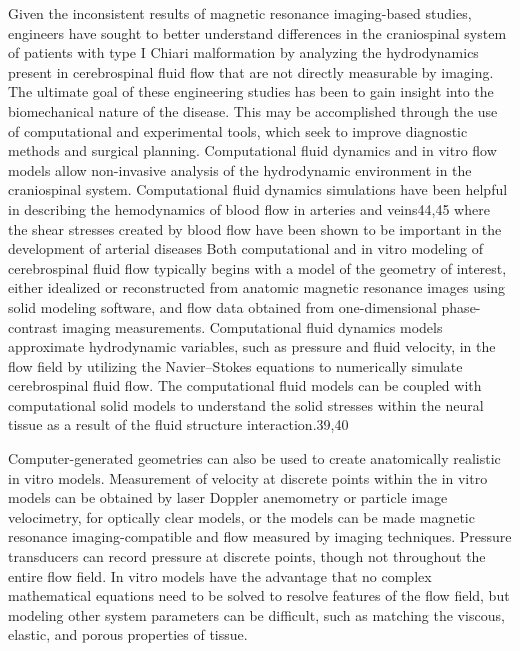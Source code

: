 \documentclass{report}
\begin{document}
Given the inconsistent results of magnetic resonance
imaging-based studies, engineers have sought to
better understand differences in the craniospinal
system of patients with type I Chiari malformation
by analyzing the hydrodynamics present in cerebrospinal
fluid flow that are not directly measurable
by imaging. The ultimate goal of these engineering
studies has been to gain insight into the biomechanical
nature of the disease. This may be accomplished
through the use of computational and experimental
tools, which seek to improve diagnostic methods and
surgical planning.
Computational fluid dynamics and in vitro flow
models allow non-invasive analysis of the hydrodynamic
environment in the craniospinal system.
Computational fluid dynamics simulations have been
helpful in describing the hemodynamics of blood flow
in arteries and veins44,45 where the shear stresses
created by blood flow have been shown to be
important in the development of arterial diseases
Both computational and in vitro modeling of
cerebrospinal fluid flow typically begins with a model
of the geometry of interest, either idealized or
reconstructed from anatomic magnetic resonance
images using solid modeling software, and flow data
obtained from one-dimensional phase-contrast imaging
measurements. Computational fluid dynamics
models approximate hydrodynamic variables, such as
pressure and fluid velocity, in the flow field by
utilizing the Navier–Stokes equations to numerically
simulate cerebrospinal fluid flow. The computational
fluid models can be coupled with computational solid
models to understand the solid stresses within the
neural tissue as a result of the fluid structure
interaction.39,40

Computer-generated geometries can also be used
to create anatomically realistic in vitro models.
Measurement of velocity at discrete points within
the in vitro models can be obtained by laser Doppler
anemometry or particle image velocimetry, for
optically clear models, or the models can be made
magnetic resonance imaging-compatible and flow
measured by imaging techniques. Pressure transducers
can record pressure at discrete points, though not
throughout the entire flow field. In vitro models have
the advantage that no complex mathematical equations
need to be solved to resolve features of the flow
field, but modeling other system parameters can be
difficult, such as matching the viscous, elastic, and
porous properties of tissue.
\end{document}
